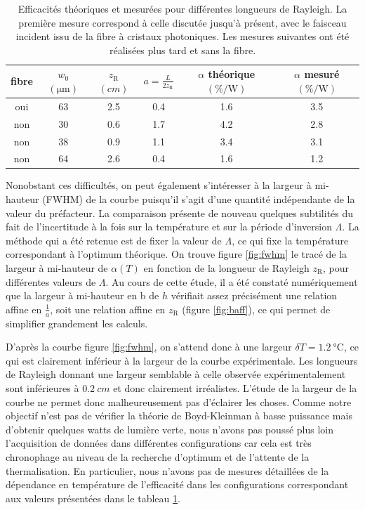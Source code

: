 \documentclass[11pt,a4paper] { article}
\newcommand{\ra}[1]{\renewcommand{\arraystretch}{#1}}
\newcommand{\zr}{z_\mathsc{R}}
\newcommand{\mathsc}[1]{\mathrm{\scriptscriptstyle {#1}}}
\begin{document}
\begin{table}[h]\centering
\ra{1.3}
\begin{tabular}{@{}cccccc@{}}\toprule
	fibre & $w_0$ $(\unit{\micro\meter})$ & $\zr$ $(\unit{cm})$ & $a=\frac L {2\zr}$ & $\alpha$ théorique $(\unit{\percent\per\watt})$ & $\alpha$ mesuré $(\unit{\percent\per\watt})$ \\ \midrule
	oui & 63     & 2.5 & 0.4 & 1.6 & 3.5 \\ \midrule  
	non & 30    & 0.6 & 1.7 & 4.2                & 2.8             \\
	non & 38    & 0.9 & 1.1 & 3.4                & 3.1             \\
	non & 64    & 2.6 & 0.4 & 1.6                & 1.2             \\ \bottomrule
\end{tabular}
\caption{Efficacités théoriques et mesurées pour différentes longueurs de Rayleigh. \small La première mesure correspond à celle discutée jusqu'à présent, avec le faisceau incident issu de la fibre à cristaux photoniques. Les mesures suivantes ont été réalisées plus tard et sans la fibre.}
\label{table:bp}
\end{table}

Nonobstant ces difficultés, on peut également s'intéresser à la largeur à mi-hauteur (FWHM) de la courbe puisqu'il s'agit d'une quantité indépendante de la valeur du préfacteur.
La comparaison présente de nouveau quelques subtilités du fait de l'incertitude à la fois sur la température et sur la période d'inversion $\Lambda$. La méthode qui a été retenue est de fixer la valeur de $\Lambda$, ce qui fixe la température correspondant à l'optimum théorique.
On trouve figure \ref{fig:fwhm} le tracé de la largeur à mi-hauteur de $\alpha(T)$ en fonction de la longueur de Rayleigh $\zr$, pour différentes valeurs de $\Lambda$. Au cours de cette étude, il a été constaté numériquement que la largeur à mi-hauteur en b de $h$ vérifiait assez précisément une relation affine en $\frac1a$, soit une relation affine en $\zr$ (figure \ref{fig:baff}), ce qui permet de simplifier grandement les calculs.

D'après la courbe figure \ref{fig:fwhm}, on s'attend donc à une largeur $\delta T = \SI{1.2}{\celsius}$, ce qui est clairement inférieur à la largeur de la courbe expérimentale. Les longueurs de Rayleigh donnant une largeur semblable à celle observée expérimentalement sont inférieures à $\SI{0.2}{cm}$ et donc clairement irréalistes. L'étude de la largeur de la courbe ne permet donc malheureusement pas d'éclairer les choses. Comme notre objectif n'est pas de vérifier la théorie de Boyd-Kleinman à basse puissance mais d'obtenir quelques watts de lumière verte, nous n'avons pas poussé plus loin l'acquisition de données dans différentes configurations car cela est très chronophage au niveau de la recherche d'optimum et de l'attente de la thermalisation. En particulier, nous n'avons pas de mesures détaillées de la dépendance en température de l'efficacité dans les configurations correspondant aux valeurs présentées dans le tableau \ref{table:bp}.
\end{document}
